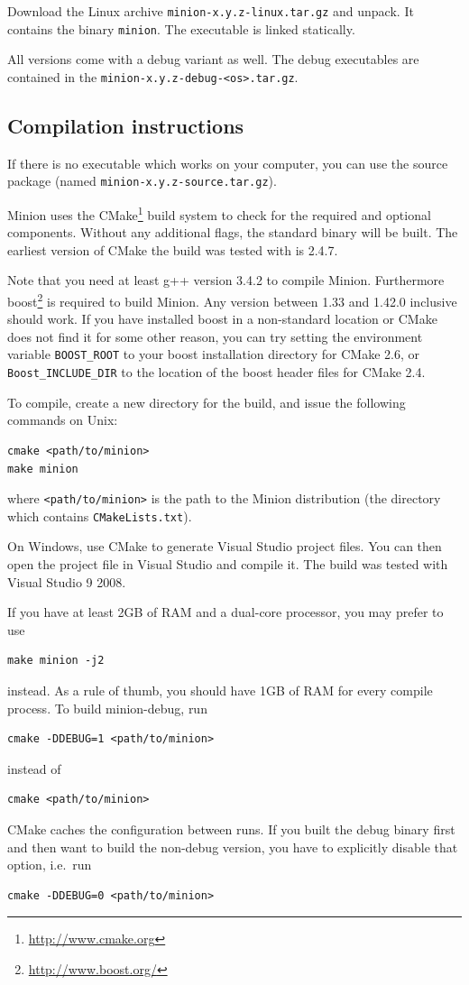 \documentclass[oneside]{book}
\begin{document}
Download the Linux archive \texttt{minion-x.y.z-linux.tar.gz} and unpack. It contains
the binary \texttt{minion}. The executable is linked statically.

\bigskip

All versions come with a debug variant as well. The debug executables are
contained in the \texttt{minion-x.y.z-debug-<os>.tar.gz}.


\subsection{Compilation instructions}

If there is no executable which works on your computer, you can use
the source package (named \texttt{minion-x.y.z-source.tar.gz}).

Minion uses the CMake\footnote{\url{http://www.cmake.org}} build system to check
for the required and optional components. Without any additional flags, the
standard binary will be built. The earliest version of CMake the build was
tested with is 2.4.7.

Note that you need at least g++ version 3.4.2 to compile Minion. Furthermore
boost\footnote{\url{http://www.boost.org/}} is required to build Minion. Any
version between 1.33 and 1.42.0 inclusive should work. If you have installed
boost in a non-standard location or CMake does not find it for some other
reason, you can try setting the environment variable \verb+BOOST_ROOT+ to your
boost installation directory for CMake 2.6, or \verb+Boost_INCLUDE_DIR+ to the
location of the boost header files for CMake 2.4.

To compile, create a new directory for the build, and issue the
following commands on Unix:

\begin{verbatim}
cmake <path/to/minion>
make minion
\end{verbatim}

where \verb+<path/to/minion>+ is the path to the Minion distribution (the
directory which contains \verb+CMakeLists.txt+).

On Windows, use CMake to generate Visual Studio project files. You can then open
the project file in Visual Studio and compile it. The build was tested with Visual
Studio 9 2008.

If you have at least 2GB of RAM and a dual-core processor, you may prefer to
use
\begin{verbatim}
make minion -j2
\end{verbatim}
instead. As a rule of thumb, you should have 1GB of RAM for every compile
process. To build minion-debug, run
\begin{verbatim}
cmake -DDEBUG=1 <path/to/minion>
\end{verbatim}
instead of
\begin{verbatim}
cmake <path/to/minion>
\end{verbatim}
CMake caches the configuration between runs. If you built the debug binary first
and then want to build the non-debug version, you have to explicitly disable
that option, i.e.\ run
\begin{verbatim}
cmake -DDEBUG=0 <path/to/minion>
\end{verbatim}
\end{document}
